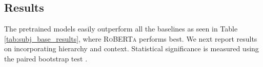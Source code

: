 \subsection{Results}
The pretrained models easily outperform all the baselines as seen in Table \ref{tab:subj_base_results}, where \textsc{RoBERTa} performs best. We next report results on incorporating hierarchy and context. Statistical significance is measured using the paired bootstrap test \cite{Efron:1994}.

\begin{table}[]
\centering
{}
\vspace{-.3em}
\caption{Overall and class-level macro-F1 on the test sets for the top-level (conversation act) and bottom-level (conversation act+intent) classes (variance in parentheses). $\dagger$ indicates not statistically significant.}
\label{tab:subj_hier_results}
\end{table}


